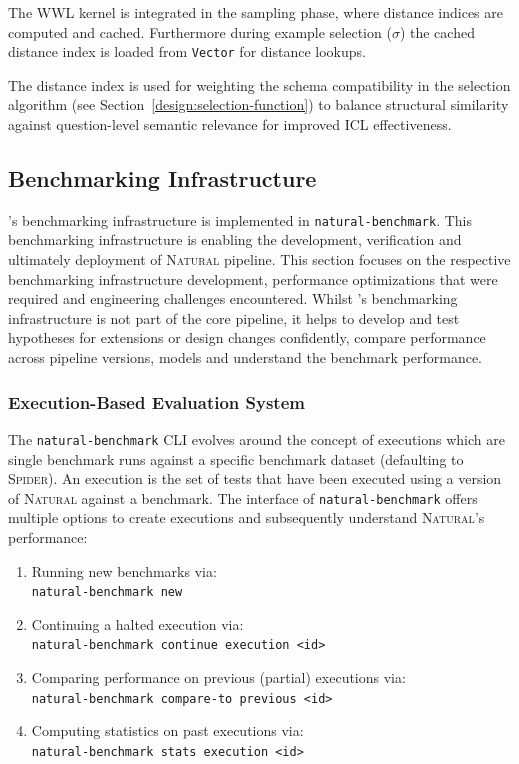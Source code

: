 The WWL kernel is integrated in the sampling phase, where distance indices are
computed and cached. Furthermore during example selection ($\sigma$) the
cached distance index is loaded from \texttt{Vector} for distance lookups.

The distance index is used for weighting the schema compatibility in the
selection algorithm (see Section~\ref{design:selection-function}) to balance
structural similarity against question-level semantic relevance for improved
ICL effectiveness.

\subsection{Benchmarking Infrastructure}\label{impl:benchmark}

\Natural's benchmarking infrastructure is implemented in
\texttt{natural-benchmark}. This benchmarking infrastructure is enabling the
development, verification and ultimately deployment of \textsc{Natural}
pipeline. This section focuses on the respective benchmarking infrastructure
development, performance optimizations that were required and engineering
challenges encountered. Whilst \Natural's benchmarking infrastructure
is not part of the core pipeline, it helps to develop and test hypotheses for
extensions or design changes confidently, compare performance across pipeline
versions, models and understand the benchmark performance.

\subsubsection{Execution-Based Evaluation System}

The \texttt{natural-benchmark} CLI evolves around the concept of executions
which are single benchmark runs against a specific benchmark dataset
(defaulting to \textsc{Spider}). An execution is the set of tests that have
been executed using a version of \textsc{Natural} against a benchmark. The
interface of \texttt{natural-benchmark} offers multiple options to create
executions and subsequently understand \textsc{Natural}'s performance:

\begin{enumerate}
    \item Running new benchmarks via: \\ \texttt{natural-benchmark new}
    \item Continuing a halted execution via: \\ \texttt{natural-benchmark continue \-\-execution <id>}
    \item Comparing performance on previous (partial) executions via: \\ \texttt{natural-benchmark compare-to \-\-previous <id>}
    \item Computing statistics on past executions via: \\ \texttt{natural-benchmark stats \-\-execution <id>}
\end{enumerate}

